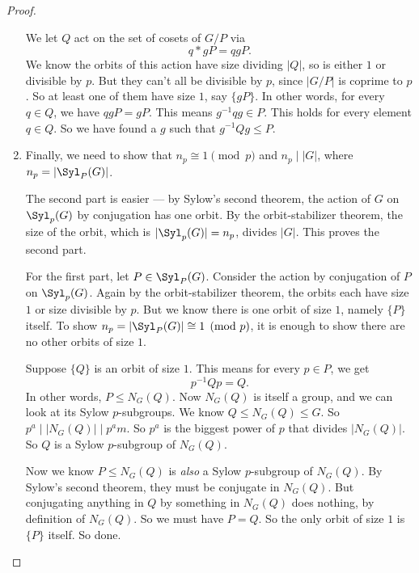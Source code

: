\documentclass[a4paper]{article}
\begin{document}
\begin{proof}
\begin{enumerate}
      We let $Q$ act on the set of cosets of $G/P$ via
      \[
        q * gP = qgP.
      \]
      We know the orbits of this action have size dividing $|Q|$, so is either $1$ or divisible by $p$. But they can't all be divisible by $p$, since $|G/P|$ is coprime to $p$. So at least one of them have size $1$, say $\{gP\}$. In other words, for every $q \in Q$, we have $qgP = gP$. This means $g^{-1}qg \in P$. This holds for every element $q \in Q$. So we have found a $g$ such that $g^{-1}Qg \leq P$.

    \item Finally, we need to show that $n_p \cong 1 \pmod p$ and $n_p \mid |G|$, where $n_p = |\Syl_P(G)|$.

      The second part is easier --- by Sylow's second theorem, the action of $G$ on $\Syl_p(G)$ by conjugation has one orbit. By the orbit-stabilizer theorem, the size of the orbit, which is $|\Syl_p(G)| = n_p$, divides $|G|$. This proves the second part.

      For the first part, let $P \in \Syl_P(G)$. Consider the action by conjugation of $P$ on $\Syl_p(G)$. Again by the orbit-stabilizer theorem, the orbits each have size $1$ or size divisible by $p$. But we know there is one orbit of size $1$, namely $\{P\}$ itself. To show $n_p = |\Syl_P(G)| \cong 1\pmod p$, it is enough to show there are no other orbits of size $1$.

      Suppose $\{Q\}$ is an orbit of size $1$. This means for every $p \in P$, we get
      \[
        p^{-1} Qp = Q.
      \]
      In other words, $P \leq N_G(Q)$. Now $N_G(Q)$ is itself a group, and we can look at its Sylow $p$-subgroups. We know $Q \leq N_G(Q) \leq G$. So $p^a \mid |N_G(Q)| \mid p^a m$. So $p^a$ is the biggest power of $p$ that divides $|N_G(Q)|$. So $Q$ is a Sylow $p$-subgroup of $N_G(Q)$.

      Now we know $P \leq N_G(Q)$ is \emph{also} a Sylow $p$-subgroup of $N_G(Q)$. By Sylow's second theorem, they must be conjugate in $N_G(Q)$. But conjugating anything in $Q$ by something in $N_G(Q)$ does nothing, by definition of $N_G(Q)$. So we must have $P = Q$. So the only orbit of size $1$ is $\{P\}$ itself. So done.
  \end{enumerate}
\end{proof}
\end{document}
